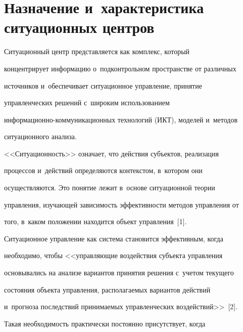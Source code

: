 




      \thispagestyle{headings}

     

    \section{Назначение и~характеристика ситуационных центров}

    

    \vspace*{-2pt}

     

    Ситуационный центр представляется как комплекс, который 

концентрирует информацию о~подконтрольном пространстве от различных 

источников и~обеспечивает ситуационное управление, принятие 

управленческих решений с~широким использованием  

ин\-фор\-ма\-ци\-он\-но-ком\-му\-ни\-ка\-ци\-он\-ных технологий (ИКТ), моделей и~методов 

ситуационного анализа. 

    

    <<Ситуационность>> означает, что действия субъектов, реализация 

процессов и~действий определяются контекстом, в~котором они 

осуществляются. Это понятие лежит в~основе ситуационной теории 

управления, изучающей зависимость эффективности методов управления от 

того, в~каком положении находится объект управления~[1]. 

    

    Ситуационное управление как система становится эффективным, когда 

необходимо, чтобы <<управляющие воздействия субъекта управления 

основывались на анализе вариантов принятия решения с~учетом текущего 

состояния объекта управления, располагаемых вариантов действий 

и~прогноза последствий принимаемых управленческих воздействий>>~[2]. 

    

    Такая необходимость практически постоянно присутствует, когда 

